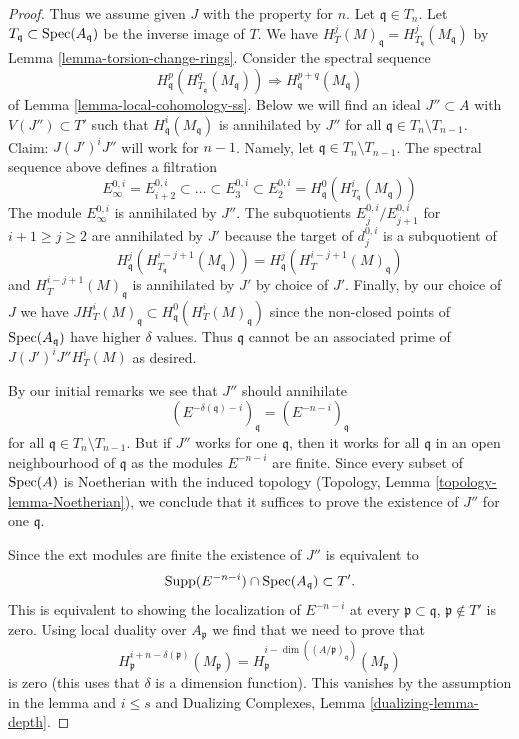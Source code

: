 \begin{proof}
\medskip\noindent
Thus we assume given $J$ with the property for $n$.
Let $\mathfrak q \in T_n$. Let $T_\mathfrak q \subset \mathop{\mathrm{Spec}}(A_\mathfrak q)$
be the inverse image of $T$. We have
$H^j_T(M)_\mathfrak q = H^j_{T_\mathfrak q}(M_\mathfrak q)$
by Lemma \ref{lemma-torsion-change-rings}.
Consider the spectral sequence
$$
H_\mathfrak q^p(H^q_{T_\mathfrak q}(M_\mathfrak q))
\Rightarrow
H^{p + q}_\mathfrak q(M_\mathfrak q)
$$
of Lemma \ref{lemma-local-cohomology-ss}.
Below we will find an ideal $J'' \subset A$ with $V(J'') \subset T'$
such that $H^i_\mathfrak q(M_\mathfrak q)$ is annihilated by $J''$ for all
$\mathfrak q \in T_n \setminus T_{n - 1}$.
Claim: $J (J')^i J''$ will work for $n - 1$.
Namely, let $\mathfrak q \in T_n \setminus T_{n - 1}$.
The spectral sequence above defines a filtration
$$
E_\infty^{0, i} = E_{i + 2}^{0, i} \subset \ldots \subset E_3^{0, i} \subset
E_2^{0, i} = H^0_\mathfrak q(H^i_{T_\mathfrak q}(M_\mathfrak q))
$$
The module $E_\infty^{0, i}$ is annihilated by $J''$.
The subquotients $E_j^{0, i}/E_{j + 1}^{0, i}$ for $i + 1 \geq j \geq 2$
are annihilated by $J'$ because the target of $d_j^{0, i}$
is a subquotient of
$$
H^j_\mathfrak q(H^{i - j + 1}_{T_\mathfrak q}(M_\mathfrak q)) =
H^j_\mathfrak q(H^{i - j + 1}_T(M)_\mathfrak q)
$$
and $H^{i - j + 1}_T(M)_\mathfrak q$ is annihilated by $J'$ by choice of $J'$.
Finally, by our choice of $J$ we have
$J H^i_T(M)_\mathfrak q \subset H^0_\mathfrak q(H^i_T(M)_\mathfrak q)$
since the non-closed points of $\mathop{\mathrm{Spec}}(A_\mathfrak q)$ have higher
$\delta$ values. Thus $\mathfrak q$ cannot be an associated prime of
$J(J')^iJ'' H^i_T(M)$ as desired.

\medskip\noindent
By our initial remarks we see that $J''$ should annihilate
$$
(E^{-\delta(\mathfrak q) - i})_\mathfrak q =
(E^{-n - i})_\mathfrak q
$$
for all $\mathfrak q \in T_n \setminus T_{n - 1}$.
But if $J''$ works for one $\mathfrak q$, then it works for all
$\mathfrak q$ in an open neighbourhood of $\mathfrak q$
as the modules $E^{-n - i}$ are finite.
Since every subset of $\mathop{\mathrm{Spec}}(A)$ is Noetherian with the induced
topology (Topology, Lemma \ref{topology-lemma-Noetherian}),
we conclude that it suffices
to prove the existence of $J''$ for one $\mathfrak q$.

\medskip\noindent
Since the ext modules are finite the existence of $J''$ is
equivalent to
$$
\text{Supp}(E^{-n - i}) \cap \mathop{\mathrm{Spec}}(A_\mathfrak q) \subset T'.
$$
This is equivalent to showing the localization of $E^{-n - i}$ at every
$\mathfrak p \subset \mathfrak q$, $\mathfrak p \not \in T'$
is zero. Using local duality over $A_\mathfrak p$ we find that we need
to prove that
$$
H^{i + n - \delta(\mathfrak p)}_\mathfrak p(M_\mathfrak p) =
H^{i - \dim((A/\mathfrak p)_\mathfrak q)}_\mathfrak p(M_\mathfrak p)
$$
is zero (this uses that $\delta$ is a dimension function).
This vanishes by the assumption in the lemma and $i \leq s$ and
Dualizing Complexes, Lemma \ref{dualizing-lemma-depth}.


\end{proof}

